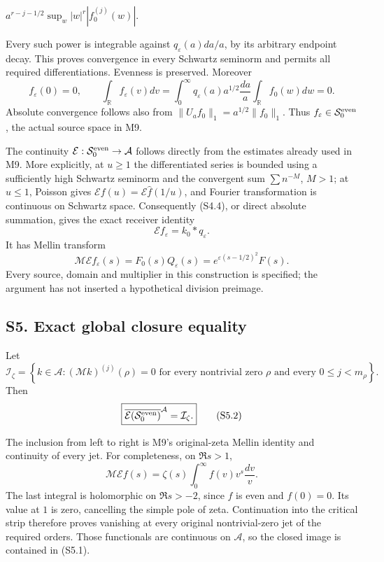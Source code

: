 \documentclass[
]{article}
\begin{document}
\(a^{r-j-1/2}\sup_w|w|^r|f_0^{(j)}(w)|\).

Every such power is integrable against \(q_\varepsilon(a)da/a\), by its
arbitrary endpoint decay. This proves convergence in every Schwartz
seminorm and permits all required differentiations. Evenness is
preserved. Moreover \[
f_\varepsilon(0)=0,
\qquad
\int_{\mathbb R}f_\varepsilon(v)dv
=\int_0^\infty q_\varepsilon(a)a^{1/2}\frac{da}{a}
\int_{\mathbb R}f_0(w)dw=0.
\tag{S4.5}
\] Absolute convergence follows also from
\(\|U_a f_0\|_1=a^{1/2}\|f_0\|_1\). Thus
\(f_\varepsilon\in\mathcal S_0^{\rm even}\), the actual source space in
M9.

The continuity \(\mathcal E:\mathcal S_0^{\rm even}\to\mathcal A\)
follows directly from the estimates already used in M9. More explicitly,
at \(u\ge1\) the differentiated series is bounded using a sufficiently
high Schwartz seminorm and the convergent sum \(\sum n^{-M}\), \(M>1\);
at \(u\le1\), Poisson gives
\(\mathcal E f(u)=\mathcal E\widehat f(1/u)\), and Fourier
transformation is continuous on Schwartz space. Consequently (S4.4), or
direct absolute summation, gives the exact receiver identity \[
\boxed{\mathcal E f_\varepsilon=k_0*q_\varepsilon.}
\tag{S4.6}
\] It has Mellin transform \[
\mathcal M\mathcal E f_\varepsilon(s)
=F_0(s)Q_\varepsilon(s)
=e^{\varepsilon(s-1/2)^2}F(s).
\tag{S4.7}
\] Every source, domain and multiplier in this construction is
specified; the argument has not inserted a hypothetical division
preimage.

\subsection{S5. Exact global closure
equality}\label{s5.-exact-global-closure-equality}

Let \[
\mathcal I_\zeta=
\left\{k\in\mathcal A:
(\mathcal M k)^{(j)}(\rho)=0
\text{ for every nontrivial zero }\rho
\text{ and every }0\le j<m_\rho\right\}.
\tag{S5.1}
\] Then \[
\boxed{
\overline{\mathcal E(\mathcal S_0^{\rm even})}^{\mathcal A}
=\mathcal I_\zeta.
}
\tag{S5.2}
\]

The inclusion from left to right is M9's original-zeta Mellin identity
and continuity of every jet. For completeness, on \(\Re s>1\), \[
\mathcal M\mathcal E f(s)
=\zeta(s)\int_0^\infty f(v)v^s\frac{dv}{v}.
\] The last integral is holomorphic on \(\Re s>-2\), since \(f\) is even
and \(f(0)=0\). Its value at \(1\) is zero, cancelling the simple pole
of zeta. Continuation into the critical strip therefore proves vanishing
at every original nontrivial-zero jet of the required orders. Those
functionals are continuous on \(\mathcal A\), so the closed image is
contained in (S5.1).
\end{document}
